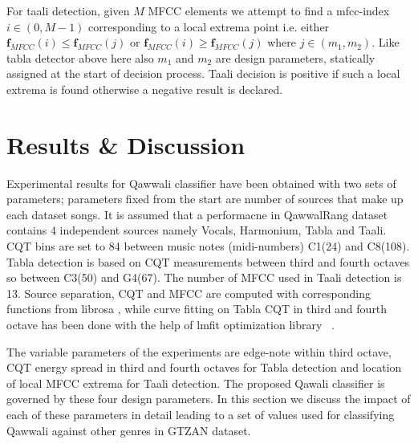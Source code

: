 \documentclass{article}
\begin{document}
For taali detection, given $M$ MFCC elements we attempt to find a mfcc-index $i \in (0, M-1)$ corresponding to a local extrema point i.e. either $\boldsymbol{f}_{MFCC}(i) \leq \boldsymbol{f}_{MFCC}(j)$ or $\boldsymbol{f}_{MFCC}(i) \geq \boldsymbol{f}_{MFCC}(j)$ where $j \in (m_{1}, m_{2})$. Like tabla detector above here also $m_{1}$ and $m_{2}$ are design parameters, statically assigned at the start of decision process. Taali decision is positive if such a local extrema is found otherwise a negative result is declared.

\section{Results \& Discussion}\label{sec:result}
Experimental results for Qawwali classifier have been obtained with two sets of parameters; parameters fixed from the start are number of sources that make up each dataset songs. It is assumed that a performacne in QawwalRang dataset contains 4 independent sources namely Vocals, Harmonium, Tabla and Taali. CQT bins are set to 84 between music notes (midi-numbers) C1(24) and C8(108). Tabla detection is based on CQT measurements between third and fourth octaves so between C3(50) and G4(67). The number of MFCC used in Taali detection is 13. Source separation, CQT and MFCC are computed with corresponding functions from librosa \citep{brian_mcfee_2022_6097378}, while curve fitting on Tabla CQT in third and fourth octave has been done with the help of lmfit optimization library ~\citep{newville_matthew_2014}.

The variable parameters of the experiments are edge-note within third octave, CQT energy spread in third and fourth octaves for Tabla detection and location of local MFCC extrema for Taali detection. The proposed Qawali classifier is governed by these four design parameters. In this section we discuss the impact of each of these parameters in detail leading to a set of values used for classifying Qawwali against other genres in GTZAN dataset.
\end{document}
